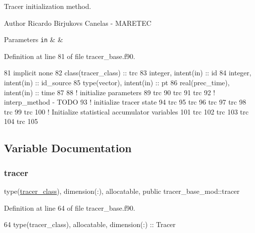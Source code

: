 Tracer initialization method. 

\begin{DoxyAuthor}{Author}
Ricardo Birjukovs Canelas -\/ M\+A\+R\+E\+T\+EC
\end{DoxyAuthor}

\begin{DoxyParams}[1]{Parameters}
\mbox{\tt in}  & {\em } & \\
\hline
\end{DoxyParams}


Definition at line 81 of file tracer\+\_\+base.\+f90.


\begin{DoxyCode}
81     \textcolor{keywordtype}{implicit none}
82     \textcolor{keywordtype}{class}(tracer\_class) :: trc
83     \textcolor{keywordtype}{integer}, \textcolor{keywordtype}{intent(in)} :: id
84     \textcolor{keywordtype}{integer}, \textcolor{keywordtype}{intent(in)} :: id\_source
85     \textcolor{keywordtype}{type}(vector), \textcolor{keywordtype}{intent(in)} :: pt
86     \textcolor{keywordtype}{real(prec\_time)}, \textcolor{keywordtype}{intent(in)} :: time
87 
88     \textcolor{comment}{! initialize parameters}
89     trc%
90     trc%
91     trc%
92     \textcolor{comment}{! interp\_method - TODO}
93     \textcolor{comment}{! initialize tracer state}
94     trc%
95     trc%
96     trc%
97     trc%
98     trc%
99     trc%
100     \textcolor{comment}{! Initialize statistical accumulator variables}
101     trc%
102     trc%
103     trc%
104     trc%
105 
\end{DoxyCode}


\subsection{Variable Documentation}
\mbox{\label{namespacetracer__base__mod_a8e683639ef8cd4f4bdcff33fffe21fc2}} 
\subsubsection{\texorpdfstring{tracer}{tracer}}
{\footnotesize\ttfamily type(\mbox{\hyperlink{structtracer__base__mod_1_1tracer__class}{tracer\+\_\+class}}), dimension(\+:), allocatable, public tracer\+\_\+base\+\_\+mod\+::tracer}



Definition at line 64 of file tracer\+\_\+base.\+f90.


\begin{DoxyCode}
64     \textcolor{keywordtype}{type}(tracer\_class), \textcolor{keywordtype}{allocatable}, \textcolor{keywordtype}{dimension(:)} :: Tracer
\end{DoxyCode}

